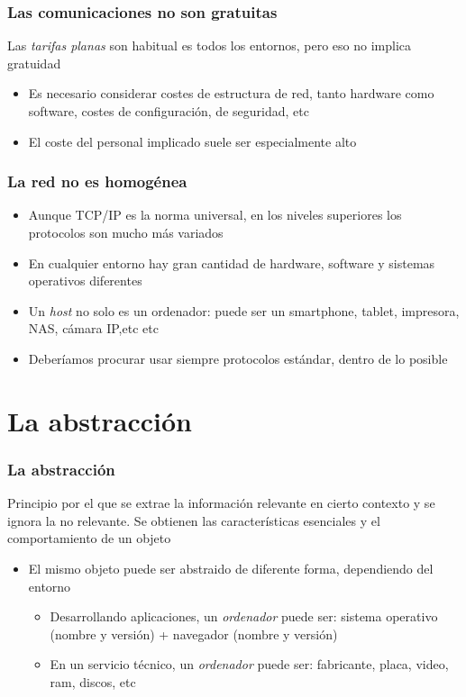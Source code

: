 \documentclass[ucs]{beamer}
\begin{document}
\begin{frame}[fragile]
\frametitle{Las comunicaciones no son gratuitas}
Las \emph{tarifas planas} son habitual es todos los entornos, pero eso
no implica gratuidad
\begin{itemize}
\item
Es necesario considerar costes de estructura de red, tanto hardware como
software, costes de configuración, de seguridad, etc
\item
El coste del personal implicado suele ser especialmente alto
\end{itemize}

\end{frame}


\begin{frame}[fragile]
\frametitle{La red no es homogénea}
\begin{itemize}
\item
Aunque TCP/IP es la norma universal, en los niveles superiores los protocolos son
mucho más variados
\item
En cualquier entorno hay gran cantidad
de hardware, software y sistemas operativos diferentes
\item
Un \emph{host} no solo es un ordenador: puede ser un smartphone, tablet,
impresora, NAS, cámara IP,etc etc
\item
Deberíamos procurar usar siempre protocolos estándar, dentro de lo posible

\end{itemize}

\end{frame}



\section{La abstracción}
\begin{frame}[fragile]
\frametitle{La abstracción}
Principio por el que se extrae la información relevante en cierto contexto y se ignora la no relevante. Se obtienen 
las características esenciales y el comportamiento de un objeto
\begin{itemize}
\item
El mismo objeto puede ser abstraido de diferente forma, dependiendo del entorno
\begin{itemize}
\item
Desarrollando aplicaciones, un \emph{ordenador} puede ser: sistema operativo (nombre y versión) + navegador (nombre y versión)
\item
En un servicio técnico, un \emph{ordenador} puede ser: fabricante, placa, video, ram, discos, etc
\end{itemize}

\end{itemize}


\end{frame}
\end{document}
